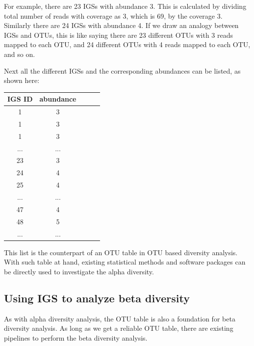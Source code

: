 For example, there are 23 IGSs with abundance 3. This is calculated by dividing  
total number of reads with coverage as 3, which is 69, by the coverage 3.
Similarly there are 24 IGSs with abundance 4. 
If we draw an analogy between IGSs and OTUs, this is like saying there are 23 
different OTUs with 3 reads mapped to each OTU, and 24 different OTUs with 4 reads mapped to each OTU, and so on.

Next all the different IGSs and the corresponding abundances can be listed,
as shown here: %
\\
\begin{tabular}{ |c | c |c| c|c| }
IGS ID & abundance \\
\hline 
1                   & 3  \\
1                 & 3  \\
1                  & 3 \\
...        & ... \\
23        & 3 \\
24        & 4 \\
25        & 4 \\
...        & ... \\
47        & 4 \\
48        & 5 \\
...        & ... \\
\end{tabular}
\begin{flushleft}
\end{flushleft}

This list is the counterpart of an 
OTU table in OTU based diversity analysis.
With such table at hand, existing statistical methods and software 
packages can be directly used to investigate the alpha diversity.  

\subsection{Using IGS to analyze beta diversity}

As with alpha diversity analysis, the OTU table is also a foundation for beta 
diversity analysis. As long as we get a reliable OTU table, there are existing 
pipelines to perform the beta diversity analysis. 

